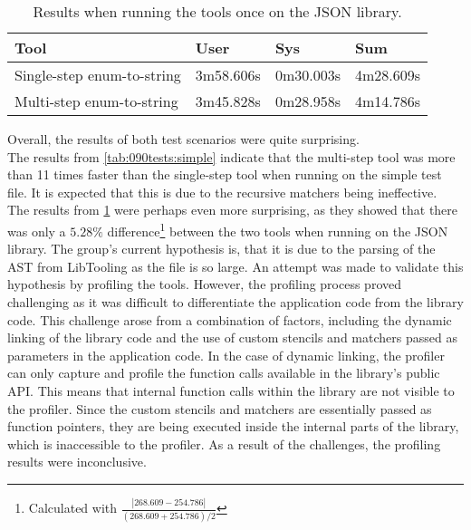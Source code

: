 \begin{table}[H]
    \centering
    \begin{tabular}{|p{}|p{}|p{}|p{}|}
    \hline
    \rowcolor{gray!30}
    \textbf{Tool} & \textbf{User} & \textbf{Sys} & \textbf{Sum} \\ \hline
    Single-step enum-to-string & 3m58.606s & 0m30.003s & 4m28.609s \\ \hline
    Multi-step enum-to-string & 3m45.828s & 0m28.958s & 4m14.786s\\ \hline
    \end{tabular}
    \caption{Results when running the tools once on the JSON library.}
    \label{tab:090tests:json}
\end{table}
\vspace*{-1em}

Overall, the results of both test scenarios were quite surprising.\\
The results from \cref{tab:090tests:simple} indicate that the multi-step tool was more than 11 times faster than the single-step tool when running on the simple test file. It is expected that this is due to the recursive matchers being ineffective.\\
The results from \cref{tab:090tests:json} were perhaps even more surprising, as they showed that there was only a $5.28\%$ difference\footnote{
    Calculated with $\frac{|268.609-254.786|}{(268.609+254.786)/2}$
} between the two tools when running on the JSON library.
The group's current hypothesis is, that it is due to the parsing of the AST from LibTooling as the file is so large.
An attempt was made to validate this hypothesis by profiling the tools. However, the profiling process proved challenging as it was difficult to differentiate the application code from the library code.
This challenge arose from a combination of factors, including the dynamic linking of the library code and the use of custom stencils and matchers passed as parameters in the application code.
In the case of dynamic linking, the profiler can only capture and profile the function calls available in the library's public API.
This means that internal function calls within the library are not visible to the profiler.
Since the custom stencils and matchers are essentially passed as function pointers, they are being executed inside the internal parts of the library, which is inaccessible to the profiler.
As a result of the challenges, the profiling results were inconclusive. 

